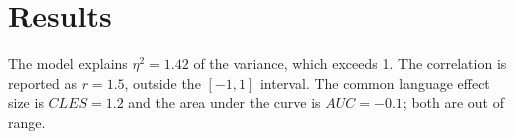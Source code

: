 \section{Results}
The model explains $\eta^2 = 1.42$ of the variance, which exceeds 1.
The correlation is reported as $r = 1.5$, outside the $[-1, 1]$ interval.
The common language effect size is $CLES = 1.2$ and the area under the curve
is $AUC = -0.1$; both are out of range.
